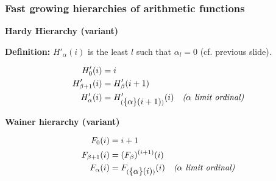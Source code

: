 \documentclass[10pt, fleqn]{beamer}
\begin{document}
\begin{frame}
  \frametitle{Fast growing hierarchies of arithmetic functions}




\begin{block}{}
 
  {\small
\textbf{Hardy Hierarchy (variant)}
    
 \textbf{Definition:} \textcolor{mathcolor}{$H'_\alpha(i)$} is the least $l$ such that \textcolor{mathcolor}{$\alpha_l=0$} (cf. previous slide). 

 
 {\color{mathcolor}
\begin{align}
  H'_0(i) & = i\\
  H'_{\beta+1}(i) &=H'_\beta(i+1) \\
  H'_\alpha(i) &= H'_{(\mbox{$\{\alpha\}(i+1)$})}(i)  \quad\textit{($\alpha$ limit ordinal)} 
\end{align}}


\vspace{6pt}

\textbf{Wainer hierarchy (variant)}

{\color{mathcolor}
\begin{align}
F_0(i)& =i+1\\
F_{\beta+1}(i)&= (F_\beta)^{(i+1)}(i)\\
F_\alpha(i) &= F_{(\mbox{$\{\alpha\}(i)$})} (i) \quad \textit{($\alpha$ limit ordinal)}
\end{align}}}
\end{block}
\end{frame}



 

 

\end{document}
